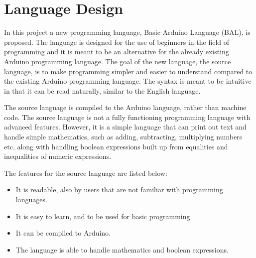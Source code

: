 \chapter{Language Design}\label{analysis:source-language}
In this project a new programming language, Basic Arduino Language (BAL), is proposed. The language is designed for the use of beginners in the field of programming and it is meant  to be an alternative for the already existing Arduino programming language.
The goal of the new language, the source language, is to make programming simpler and easier to understand compared to the existing Arduino programming language. The syntax is meant to be intuitive in that it can be read naturally, similar to the English language.

The source language is compiled to the Arduino language, rather than machine code. The source language is not a fully functioning programming language with advanced features. However, it is a simple language that can print out text and handle simple mathematics, such as adding, subtracting, multiplying numbers etc. along with handling boolean expressions built up from equalities and inequalities of numeric expressions.

The features for the source language are listed below:
\begin{itemize}
	\item It is readable, also by users that are not familiar with programming languages.
	\item It is easy to learn, and to be used for basic programming.
	\item It can be compiled to Arduino.
	\item The language is able to handle mathematics and boolean expressions.
\end{itemize}